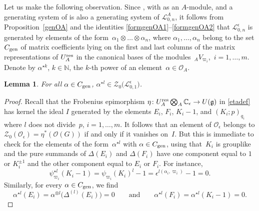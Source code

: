 \documentclass[10pt,a4paper]{amsart}
\numberwithin{equation}{section}
\newtheorem{lem}[teo]{Lemma}
\theoremstyle{definition}
\newcommand{\e}{\epsilon}
\newcommand{\mc}{\mathbb{C}}
\newcommand{\Ll}{{\mathcal L}}
\newcommand{\Oo}{{\mathcal O}}
\newcommand{\ra}{\rightarrow}
\begin{document}
Let us make the following observation. Since \smash{$\Ll_{0,n}^\e = \Ll_{0,n}^A \bigotimes_A \mc_\e$}, with \smash{$\Ll_{0,n}^A = \Oo_A^{\otimes n}$} as an $A$-module, and a generating system of \smash{$\Oo_A^{\otimes n}$} is also a generating system of $\Ll_{0,n}^A$, it follows from Proposition~\ref{genOA} and the identities \eqref{formgenOA1}--\eqref{formgenOA2} that $\Ll_{0,n}^\e$ is generated by elements of the form~${\alpha_1 \otimes \dots \otimes \alpha_n}$, where $\alpha_1,\dots , \alpha_n$ belong to the set $C_{\rm gen}$ of matrix coefficients lying on the first and last columns of the matrix representations of $U_A^{\rm res}$ in the canonical bases of the modules~${{}_AV_{\varpi_i}}$,~$i=1,\dots, m$. Denote by $\alpha^{\star k}$, $k\in \mathbb{N}$, the $k$-th power of an element~${\alpha\in \Oo_A}$.
\begin{lem} For all $\alpha\in C_{\rm gen}$, $\alpha^{\star l}\in \mathcal{Z}_0\bigl(\Ll_{0,1}^\e\bigr)$.
\end{lem}

\begin{proof} Recall that the Frobenius epimorphism $\eta\colon U_A^{\rm res} \bigotimes_A \mc_\e \ra U(\mathfrak{g})$ in \eqref{etadef} has kernel the ideal $I$ generated by the elements $E_i$, $F_i$, $K_i-1$, and $(K_i;p)_{q_i}$ where $l$ does not divide~$p$, ${i=1,\dots,m}$. It follows that an element of $\Oo_\e$ belongs to $\mathcal{Z}_0(\Oo_\e)=\eta^*(\Oo(G))$ if and only if it vanishes on~$I$. But this is immediate to check for the elements of the form~$\alpha^{\star l}$ with $\alpha\in C_{\rm gen}$, using that~$K_i$ is grouplike and the pure summands of $\Delta(E_i)$ and $\Delta(F_i)$ have one component equal to $1$ or $K_i^{\pm 1}$ and the other component equal to $E_i$ or $F_i$. For instance,
\[
\psi_{\varpi_i}^{\star l}(K_i-1) = \psi_{\varpi_i}(K_i)^l-1 = \e^{l(\alpha_i,\varpi_i)} - 1=0.
\]
 Similarly, for every $\alpha \in C_{\rm gen}$, we find
 \[
\alpha^{\star l}(E_i) =\alpha^{\otimes l}\big(\Delta^{(l)}(E_i)\big)=0 \qquad \text{and} \qquad \alpha^{\star l}(F_i)=\alpha^{\star l}(K_i-1)=0.\tag*{\qed}
\]\renewcommand{\qed}{}
\end{proof}
\end{document}
